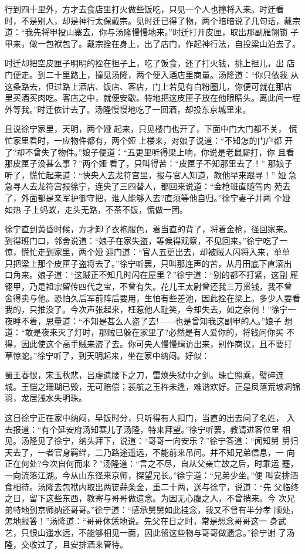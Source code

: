 行到四十里外，方才去食店里打火做些饭吃，只见一个人也撞将入来。时迁看
时，不是别人，却是神行太保戴宗。见时迁已得了物，两个暗暗说了几句话，戴宗
道：“我先将甲投山寨去，你与汤隆慢慢地来。”时迁打开皮匣，取出那副雁翎锁
子甲来，做一包袱包了。戴宗拴在身上，出了店门，作起神行法，自投梁山泊去了。

时迁却把空皮匣子明明的拴在担子上，吃了饭食，还了打火钱，挑上担儿，出
店门便走。到二十里路上，撞见汤隆，两个便入酒店里商量。汤隆道：“你只依我
从这条路去，但过路上酒店、饭店、客店，门上若见有白粉圈儿，你便可就在那店
里买酒买肉吃。客店之中，就便安歇。特地把这皮匣子放在他眼睛头。离此间一程
外等我。”时迁依计去了。汤隆慢慢地吃了一回酒，却投东京城里来。

且说徐宁家里，天明，两个娅起来，只见楼门也开了，下面中门大门都不关，
慌忙家里看时，一应物件都有，两个娅上楼来，对娘子说道：“不知怎的门户都
开了?却不曾失了物件。”娘子便道：“五更里听得梁上响，你说是老鼠厮打，你
且看那皮匣子没甚么事？”两个娅看了，只叫得苦：“皮匣子不知那里去了！”
那娘子听了，慌忙起来道：“快央人去龙符宫里，报与官人知道，教他早来跟寻！”
娅急急寻人去龙符宫报徐宁，连央了三四替人，都回来说道：“金枪班直随驾内
苑去了，外面都是亲军护御守把，谁人能够入去?直须等他自归。”徐宁妻子并两
个娅，如热子上蚂蚁，走头无路，不茶不饭，慌做一团。

徐宁直到黄昏时候，方才卸了衣袍服色，着当直的背了，将着金枪，径回家来。
到得班门口，邻舍说道：“娘子在家失盗，等候得观察，不见回来。”徐宁吃了一
惊，慌忙走到家里，两个娅迎门道：“官人五更出去，却被贼人闪将入来，单单
只把梁上那个皮匣子盗将去了。”徐宁听罢，只叫那连声的苦，从丹田底下直滚出
口角来。娘子道：“这贼正不知几时闪在屋里？”徐宁道：“别的都不打紧，这副
雁翎甲，乃是祖宗留传四代之宝，不曾有失。花儿王太尉曾还我三万贯钱，我不曾
舍得卖与他。恐怕久后军前阵后要用，生怕有些差池，因此拴在梁上。多少人要看
我的，只推没了。今次声张起来，枉惹他人耻笑，今却失去，如之奈何！”徐宁一
夜睡不着，思量道：“不知是甚么人盗了去!——也是曾知我这副甲的人。”娘子
想道：“敢是夜来灭了灯时，那贼已躲在家里了?必然是有人爱你的，将钱问你买
不得，因此使这个高手贼来盗了去。你可央人慢慢缉访出来，别作商议，且不要打
草惊蛇。”徐宁听了，到天明起来，坐在家中纳闷。好似：

蜀王春恨，宋玉秋悲，吕虔遗腰下之刀，雷焕失狱中之剑。珠亡照乘，璧碎连
城。王恺之珊瑚已毁，无可赔偿；裴航之玉杵未逢，难谐欢好。正是凤落荒坡凋锦
羽，龙居浅水失明珠。

这日徐宁正在家中纳闷，早饭时分，只听得有人扣门，当直的出去问了名姓，
入去报道：“有个延安府汤知寨儿子汤隆，特来拜望。”徐宁听罢，教请进客位里
相见。汤隆见了徐宁，纳头拜下，说道：“哥哥一向安乐？”徐宁答道：“闻知舅
舅归天去了，一者官身羁绊，二乃路途遥远，不能前来吊问。并不知兄弟信息，一
向正在何处?今次自何而来？”汤隆道：“言之不尽，自从父亲亡故之后，时乖运
蹇，一向流落江湖。今从山东径来京师，探望兄长。”徐宁道：“兄弟少坐。”便
叫安排酒食相待。汤隆去包袱内取出两锭蒜条金，重二十两，送与徐宁，说道：“先
父临终之日，留下这些东西，教寄与哥哥做遗念。为因无心腹之人，不曾捎来。今
次兄弟特地到京师纳还哥哥。”徐宁道：“感承舅舅如此挂念，我又不曾有半分孝
顺处，怎地报答！”汤隆道：“哥哥休恁地说。先父在日之时，常是想念哥哥这一
身武艺，只恨山遥水远，不能够相见一面，因此留这些物与哥哥做遗念。”徐宁谢
了汤隆，交收过了，且安排酒来管待。

